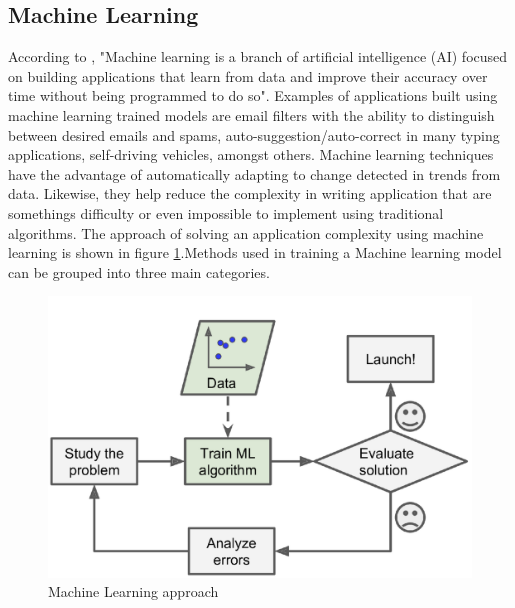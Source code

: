 \documentclass[conference]{IEEEtran}
\begin{document}
\subsection{Machine Learning}
According to \cite{ibm_cloud_education_2020}, "Machine learning is a branch of artificial intelligence (AI) focused on building applications that learn from data and improve their accuracy over time without being programmed to do so". Examples of applications built using machine learning trained models are email filters with the ability to distinguish between desired emails and spams, auto-suggestion/auto-correct in many typing applications, self-driving vehicles, amongst others. Machine learning techniques have the advantage of automatically adapting to change detected in trends from data. Likewise, they help reduce the complexity in writing application that are somethings difficulty or even impossible to implement using traditional algorithms. The approach of solving an application complexity using machine learning is shown in figure \ref{fig:machine_approach}.Methods used in training a Machine learning model can be grouped into three main categories.


\begin{figure}[htbp]
	\centerline{\includegraphics [scale=0.32]{figures/machine_approach.png}}
	\caption{Machine Learning approach \cite{geron2019hands}}
	\label{fig:machine_approach}
\end{figure}
\end{document}
